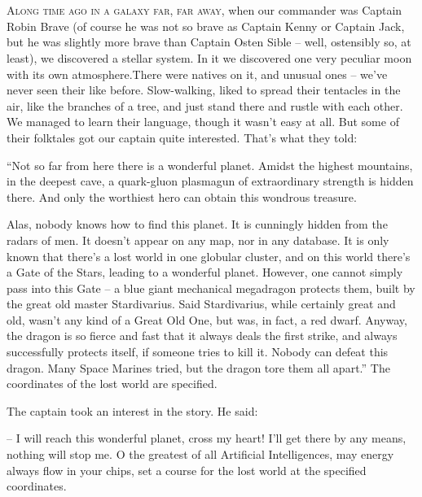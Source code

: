 \documentclass[ebook,twoside,final,openright]{memoir}
\begin{document}
\chapter{}
\par
\lettrine{A}{long time ago in a galaxy far, far away,} when our commander was Captain Robin Brave (of course he was not so brave as Captain Kenny or Captain Jack, but he was slightly more brave than Captain Osten Sible – well, ostensibly so, at least), we discovered a stellar system. In it we discovered one very peculiar moon with its own atmosphere.There were natives on it, and unusual ones – we’ve never seen their like before. Slow-walking, liked to spread their tentacles in the air, like the branches of a tree, and just stand there and rustle with each other. We managed to learn their language, though it wasn’t easy at all. But some of their folktales got our captain quite interested. That’s what they told:\par
\par
“Not so far from here there is a wonderful planet. Amidst the highest mountains, in the deepest cave, a quark-gluon plasmagun of extraordinary strength is hidden there. And only the worthiest hero can obtain this wondrous treasure. \par
Alas, nobody knows how to find this planet. It is cunningly hidden from the radars of men. It doesn’t appear on any map, nor in any database. It is only known that there’s a lost world in one globular cluster, and on this world there’s a Gate of the Stars, leading to a wonderful planet. However, one cannot simply pass into this Gate – a blue giant mechanical megadragon protects them, built by the great old master Stardivarius. Said Stardivarius, while certainly great and old, wasn’t any kind of a Great Old One, but was, in fact, a red dwarf. Anyway, the dragon is so fierce and fast that it always deals the first strike, and always successfully protects itself, if someone tries to kill it. Nobody can defeat this dragon. Many Space Marines tried, but the dragon tore them all apart.” The coordinates of the lost world are specified.\par
\par
The captain took an interest in the story. He said:\par
– I will reach this wonderful planet, cross my heart! I'll get there by any means, nothing will stop me. O the greatest of all Artificial Intelligences, may energy always flow in your chips, set a course for the lost world at the specified coordinates.\par
\end{document}

